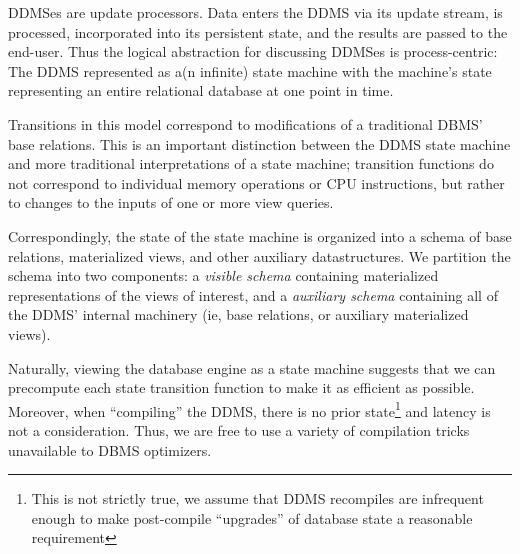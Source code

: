 

DDMSes are update processors.  Data enters the DDMS via its update stream, is processed, incorporated into its persistent state, and the results are passed to the end-user.  Thus the logical abstraction for discussing DDMSes is process-centric: The DDMS represented as a(n infinite) state machine with the machine's state representing an entire relational database at one point in time.

Transitions in this model correspond to modifications of a traditional DBMS' base relations.  This is an important distinction between the DDMS state machine and more traditional interpretations of a state machine; transition functions do not correspond to individual memory operations or CPU instructions, but rather to changes to the inputs of one or more view queries.

Correspondingly, the state of the state machine is organized into a schema of
base relations, materialized views, and other auxiliary datastructures.  We
partition the schema into two components: a \textit{visible schema} containing
materialized representations of the views of interest, and a \textit{auxiliary
schema} containing all of the DDMS' internal machinery (ie, base relations, or
auxiliary materialized views).

Naturally, viewing the database engine as a state machine suggests that we can
precompute each state transition function to make it as efficient as possible. 
Moreover, when ``compiling'' the DDMS, there is no prior state\footnote{This is
not strictly true, we assume that DDMS recompiles are infrequent enough to make
post-compile ``upgrades'' of database state a reasonable requirement} and
latency is not a consideration.  Thus, we are free to use a variety of
compilation tricks unavailable to DBMS optimizers.


